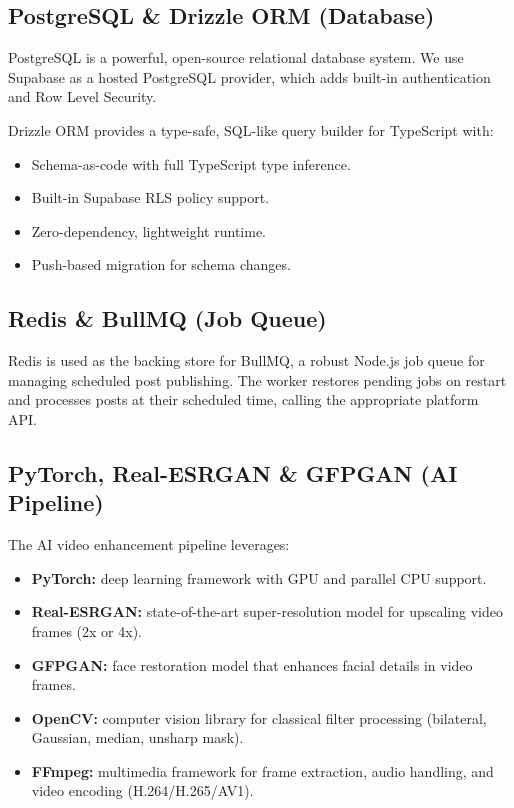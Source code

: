 \subsection{PostgreSQL \& Drizzle ORM (Database)}

PostgreSQL is a powerful, open-source relational database system. We use Supabase as a hosted PostgreSQL provider, which adds built-in authentication and Row Level Security.

Drizzle ORM provides a type-safe, SQL-like query builder for TypeScript with:

\begin{itemize}
    \item Schema-as-code with full TypeScript type inference.
    \item Built-in Supabase RLS policy support.
    \item Zero-dependency, lightweight runtime.
    \item Push-based migration for schema changes.
\end{itemize}

\subsection{Redis \& BullMQ (Job Queue)}

Redis is used as the backing store for BullMQ, a robust Node.js job queue for managing scheduled post publishing. The worker restores pending jobs on restart and processes posts at their scheduled time, calling the appropriate platform API.

\subsection{PyTorch, Real-ESRGAN \& GFPGAN (AI Pipeline)}

The AI video enhancement pipeline leverages:

\begin{itemize}
    \item \textbf{PyTorch:} deep learning framework with GPU and parallel CPU support.
    \item \textbf{Real-ESRGAN:} state-of-the-art super-resolution model for upscaling video frames (2x or 4x).
    \item \textbf{GFPGAN:} face restoration model that enhances facial details in video frames.
    \item \textbf{OpenCV:} computer vision library for classical filter processing (bilateral, Gaussian, median, unsharp mask).
    \item \textbf{FFmpeg:} multimedia framework for frame extraction, audio handling, and video encoding (H.264/H.265/AV1).
\end{itemize}

